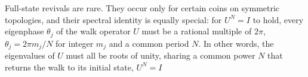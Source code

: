 Full-state revivals are rare. They occur only for certain coins on
symmetric topologies, and their spectral identity is equally special:
for $U^N = I$ to hold, every eigenphase $\theta_j$ of the walk operator
$U$ must be a rational multiple of $2\pi$, $\theta_j = 2\pi m_j / N$
for integer $m_j$ and a common period $N$. In other words, the
eigenvalues of $U$ must all be roots of unity, sharing a common power
$N$ that returns the walk to its initial state, $U^N = I$
